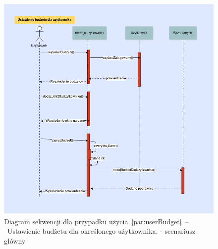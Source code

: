 \begin{figure}[H]
    \includegraphics[width=\textwidth,
    height=0.5\textheight]{images/dodanie_budzetu_dla_usera.png}
    \caption{Diagram sekwencji dla przypadku użycia~\ref{par:userBudget}~--~Ustawienie budżetu dla określonego użytkownika.
    - scenariusz główny}
\end{figure}

